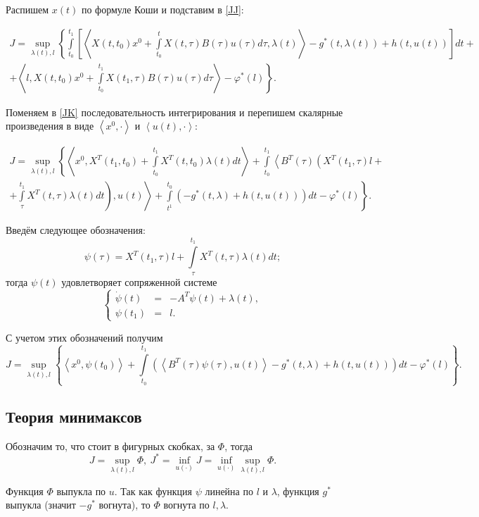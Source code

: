 Распишем $x(t)$ по формуле Коши и подставим в \eqref{JJ}:

\begin{multline}\label{JK}
J=\sup_{\lambda(t),l}\left\lbrace \int\limits_{t_0}^{t_1}\left[\left< X(t,t_0)x^0+\int\limits_{t_0}^{t}X(t,\tau)B(\tau)u(\tau)d\tau ,\lambda(t) \right> - g^*(t,\lambda(t)) +h(t,u(t))\right] dt +\right.\\ \left. + \left<l,X(t,t_0)x^0+\int\limits_{t_0}^{t_1}X(t_1,\tau)B(\tau)u(\tau)d\tau\right> - \varphi^*(l)\right\rbrace.
\end{multline}

Поменяем в \eqref{JK} последовательность интегрирования и перепишем скалярные произведения в виде  $ \left<x^0, \cdot\right>$ и $ \left<u(t), \cdot\right>$:

\begin{multline}
J=\sup_{\lambda(t),l}\left\lbrace \left<x^0,X^{T}(t_1,t_0) + \int\limits_{t_0}^{t_1}X^{T}(t,t_0)\lambda(t)dt \right> + \int\limits_{t_0}^{t_1}\left< B^{T}(\tau)\left( X^{T}(t_1,\tau)l + \right. \right. \right. \\ \left. \left. \left. + \int\limits_{\tau}^{t_1}X^{T}(t,\tau)\lambda(t)dt \right),u(t) \right> + \int\limits^{t_0}_{t^1}\left( -g^*(t,\lambda)+h(t,u(t))\right)dt - \varphi^*(l) \right\rbrace.
\end{multline}

Введём следующее обозначения:
\begin{equation*}
\psi(\tau)= X^{T}(t_1,\tau)l + \int\limits_{\tau}^{t_1}X^{T}(t,\tau)\lambda(t)dt;
\end{equation*}
тогда $\psi(t)$ удовлетворяет сопряженной системе
\begin{equation}
\left\lbrace \begin{array}{rcl}
		\dot{\psi}(t)&=&-A^{T}\psi(t)+\lambda(t),\\
		\psi(t_1)&=&l.
	   \end{array}
	   \right.
\end{equation}

С учетом этих обозначений получим
\begin{equation}
J=\sup_{\lambda(t),l}\left\lbrace \left<x^0,\psi(t_0) \right> + \int\limits_{t_0}^{t_1}\left(\left< B^{T}(\tau)\psi(\tau),u(t) \right>  -g^*(t,\lambda)+h(t,u(t))\right)dt - \varphi^*(l) \right\rbrace.
\end{equation}
\subsection{Теория минимаксов}
Обозначим то, что стоит в фигурных скобках, за $ \Phi $, тогда 
\begin{equation*} J=\sup_{\lambda(t),l}\Phi ,~ J^*=\inf_{u(\cdot)}J=\inf_{u(\cdot)}\sup_{\lambda(t),l}\Phi .
\end{equation*}
\par Функция $\Phi$ выпукла по $u$. Так как функция $\psi$ линейна по $l$ и $\lambda$,
функция $g^*$ выпукла (значит $-g^*$ вогнута), то $\Phi$ вогнута по $l,\lambda$.

